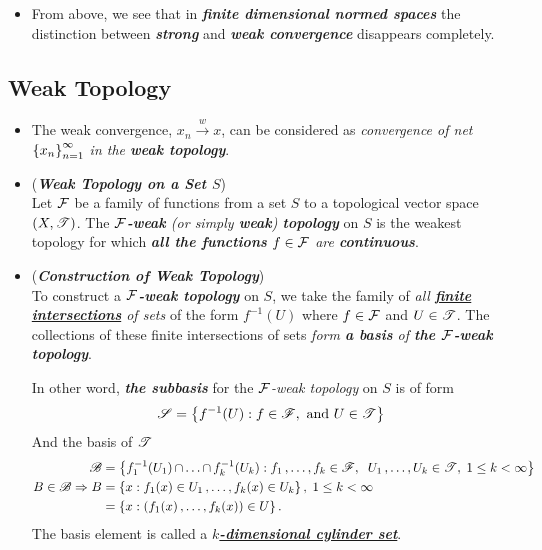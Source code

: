 \documentclass[11pt]{article}
\begin{document}
\begin{itemize}
\item \begin{remark}
From above, we see that in \emph{\textbf{finite dimensional normed spaces}} the distinction between \emph{\textbf{strong}} and \emph{\textbf{weak convergence}} disappears completely. 
\end{remark}

\end{itemize}
\subsection{Weak Topology}
\begin{itemize}
\item \begin{remark}
The weak convergence, $x_n \stackrel{w}{\rightarrow} x$, can be considered as \emph{convergence of net $\left\{x_n\right\}_{n=1}^{\infty}$ in the \textbf{weak topology}}.
\end{remark}

\item \begin{definition} (\textbf{\emph{Weak Topology on a Set $S$}})  \citep{reed1980methods}\\
Let ${\mathcal F}$ be a family of functions from a set $S$ to a topological vector space $(X, {\mathscr T})$. The \emph{\textbf{${\mathcal F}$-weak} (or simply \textbf{weak}) \textbf{topology}} on $S$ is the weakest topology for which \emph{\textbf{all the functions} $f \in {\mathcal F}$ are \textbf{continuous}}.
\end{definition}

\item \begin{remark} (\emph{\textbf{Construction of Weak Topology}}) \citep{reed1980methods} \\
To construct a \emph{\textbf{${\mathcal F}$-weak topology}} on $S$, we take the family of \emph{all \underline{\textbf{finite intersections}} of sets} of the form $f^{-1}(U)$ where $f \in {\mathcal F}$ and $U \in {\mathscr T}$. The collections of these finite intersections of sets \emph{form \textbf{a basis} of \textbf{the ${\mathcal F}$-weak topology}}.

In other word, \emph{\textbf{the subbasis}} for the \emph{${\mathcal F}$-weak topology} on $S$ is of form 
\begin{align*}
{\mathscr S} = \left\{f^{-1}(U):  f \in {\mathscr F}, \text{ and }  U \in {\mathscr T}\right\}
\end{align*}
And the basis of ${\mathscr T}$
\begin{align*}
{\mathscr B} &= \left\{f_1^{-1}(U_1) \,{\cap}\ldots{\cap}\, f_k^{-1}(U_k): f_1 \,{,}\ldots{,}\, f_k \in {\mathscr F}, \;\; U_1 \,{,}\ldots{,}\, U_k \in {\mathscr T}, \;1 \le k < \infty\right\}\\
B \in {\mathscr B} \Rightarrow B &= \left\{x: f_1(x) \in U_1 \,{,}\ldots{,}\, f_k(x) \in U_k\right\},\; 1 \le k < \infty \\
&= \left\{x: (f_1(x) \,{,}\ldots{,}\, f_k(x)) \in U\right\}.
\end{align*} The basis element is called a \underline{\emph{\textbf{$k$-dimensional cylinder set}}}.
\end{remark}


\end{itemize}
\end{document}
